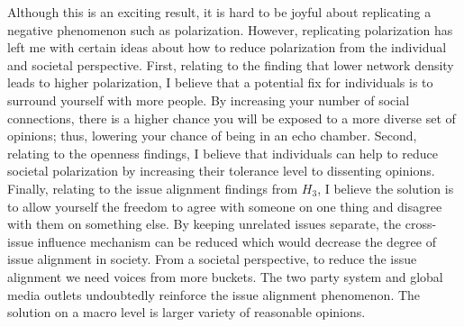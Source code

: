Although this is an exciting result, it is hard to be joyful about replicating a negative phenomenon such as polarization. However, replicating polarization has left me with certain ideas about how to reduce polarization from the individual and societal perspective. First, relating to the finding that lower network density leads to higher polarization, I believe that a potential fix for individuals is to surround yourself with more people. By increasing your number of social connections, there is a higher chance you will be exposed to a more diverse set of opinions; thus, lowering your chance of being in an echo chamber. Second, relating to the openness findings, I believe that individuals can help to reduce societal polarization by increasing their tolerance level to dissenting opinions. Finally, relating to the issue alignment findings from $H_{3}$, I believe the solution is to allow yourself the freedom to agree with someone on one thing and disagree with them on something else. By keeping unrelated issues separate, the cross-issue influence mechanism can be reduced which would decrease the degree of issue alignment in society. From a societal perspective, to reduce the issue alignment we need voices from more buckets. The two party system and global media outlets undoubtedly reinforce the issue alignment phenomenon. The solution on a macro level is larger variety of reasonable opinions.    
